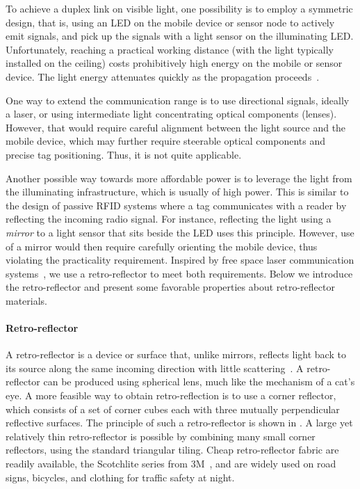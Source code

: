 To achieve a duplex link on visible light, one possibility is to employ a symmetric design, that is, using an LED on the mobile device or sensor node to actively emit signals, and pick up the signals with a light sensor on the illuminating LED. Unfortunately, reaching a practical working distance (with the light typically installed on the ceiling) costs prohibitively high energy on the mobile or sensor device. The light energy attenuates quickly as the propagation proceeds~\cite{lightwave}.

One way to extend the communication range is to use directional signals, ideally a laser, or using intermediate light concentrating optical components (\eg lenses).
However, that would require careful alignment between the light source and the mobile device, which may further require steerable optical components and  precise tag positioning. Thus, it is not quite applicable. 


Another possible way towards more affordable power is to leverage the light from the illuminating infrastructure, which is usually of high power. This is similar to the design of passive RFID systems where a tag communicates with a reader by reflecting the incoming radio signal. For instance, reflecting the light using a \textit{mirror} to a light sensor that sits beside the LED uses this principle. However, use of a mirror would then require carefully orienting the mobile device, thus violating the practicality requirement. Inspired by free space laser communication systems~\cite{mrr}, we use a retro-reflector to meet both requirements. Below we introduce the retro-reflector and present some favorable properties about retro-reflector materials. 



\paragraph{Retro-reflector} 
A retro-reflector is a device or surface that, unlike mirrors, reflects light back to its source along the same incoming direction with little scattering~\cite{rr}. 
A retro-reflector can be produced using spherical lens, much like the mechanism of a cat's eye. A more feasible way to obtain retro-reflection is to use a corner reflector, which consists of a set of corner cubes each with three mutually perpendicular reflective surfaces. The principle of such a retro-reflector is shown in . A large yet relatively thin retro-reflector is possible by combining many small corner reflectors, using the standard triangular tiling. 
Cheap retro-reflector fabric are readily available, \eg the Scotchlite series from 3M~\cite{rrsheet}, and are widely used on road signs, bicycles, and clothing for traffic safety at night. %


